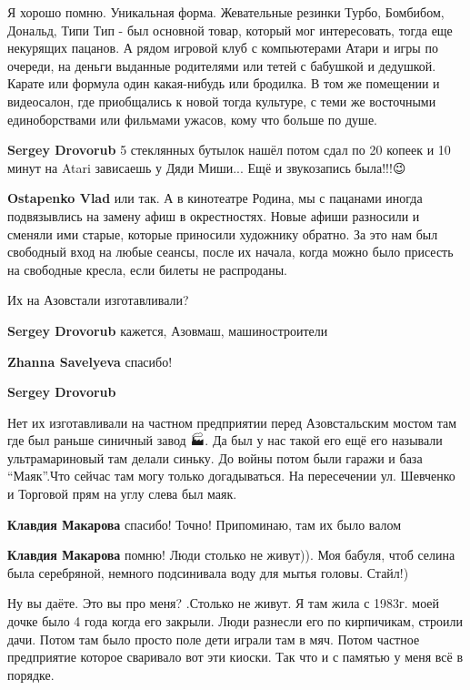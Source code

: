 
Я хорошо помню. Уникальная форма. Жевательные резинки Турбо, Бомбибом, Дональд,
Типи Тип - был основной товар, который мог интересовать, тогда еще некурящих
пацанов. А рядом игровой клуб с компьютерами Атари и игры по очереди, на деньги
выданные родителями или тетей с бабушкой и дедушкой. Карате или формула один
какая-нибудь или бродилка. В том же помещении и видеосалон, где приобщались к
новой тогда культуре, с теми же восточными единоборствами или фильмами ужасов,
кому что больше по душе.

\begin{itemize} %
\textbf{Sergey Drovorub} 5 стеклянных бутылок нашёл потом сдал по 20 копеек и 10 минут на Atari зависаешь у Дяди Миши... Ещё и звукозапись была!!!😉

\textbf{Ostapenko Vlad} или так. А в кинотеатре Родина, мы с пацанами иногда подвязывлись на замену афиш в окрестностях. Новые афиши разносили и сменяли ими старые, которые приносили художнику обратно. За это нам был свободный вход на любые сеансы, после их начала, когда можно было присесть на свободные кресла, если билеты не распроданы.
\end{itemize} %


Их на Азовстали изготавливали?

\begin{itemize} %
\textbf{Sergey Drovorub} кажется, Азовмаш, машиностроители

\begin{itemize} %
\textbf{Zhanna Savelyeva} спасибо! 🙂
\end{itemize} %

\textbf{Sergey Drovorub} 

Нет их изготавливали на частном предприятии перед Азовстальским мостом там где
был раньше синичный завод 🏭. Да был у нас такой его ещё его называли
ультрамариновый там делали синьку. До войны потом были гаражи и база \enquote{Маяк}.Что
сейчас там могу только догадываться. На пересечении ул. Шевченко и Торговой прям
на углу слева был маяк.

\begin{itemize} %
\textbf{Клавдия Макарова} спасибо! Точно! Припоминаю, там их было валом 🙂

\textbf{Клавдия Макарова} помню! Люди столько не живут)). Моя бабуля, чтоб селина была серебряной, немного подсинивала воду для мытья головы. Стайл!)


Ну вы даёте. Это вы про меня? .Столько не живут. Я там жила с 1983г. моей дочке
было 4 года когда его закрыли. Люди разнесли его по кирпичикам, строили дачи.
Потом там было просто поле дети играли там в мяч. Потом частное предприятие
которое сваривало вот эти киоски. Так что и с памятью у меня всё в порядке.

\end{itemize} %

\end{itemize} %


